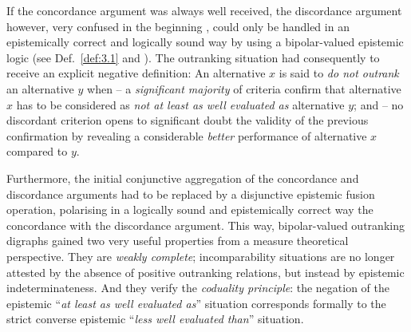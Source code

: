 If the concordance argument was always well received, the discordance argument however, very confused in the beginning \citep{ROY-1966}, could only be handled in an epistemically correct and logically sound way by using a bipolar-valued epistemic logic (see Def.~\vref{def:3.1} and \citealp{BIS-2013}). The outranking situation had consequently to receive an explicit negative definition: An alternative $x$ is said to \emph{do not outrank} an alternative $y$ when – a \emph{significant majority} of criteria confirm that alternative $x$ has to be considered as \emph{not at least as well evaluated as} alternative $y$; and – no discordant criterion opens to significant doubt the validity of the previous confirmation by revealing a considerable \emph{better} performance of alternative $x$ compared to $y$.

Furthermore, the initial conjunctive aggregation of the concordance and discordance arguments had to be replaced by a disjunctive epistemic fusion operation, polarising in a logically sound and epistemically correct way the concordance with the discordance argument. This way, bipolar-valued outranking  digraphs gained two very useful properties from a measure theoretical perspective. They are \emph{weakly complete}; incomparability situations are no longer attested by the absence of positive outranking relations, but instead by epistemic indeterminateness. And they verify the \emph{coduality principle}: the negation of the epistemic ``\emph{at least as well evaluated as}'' situation corresponds formally to the strict converse epistemic ``\emph{less well evaluated than}'' situation.



%
%
